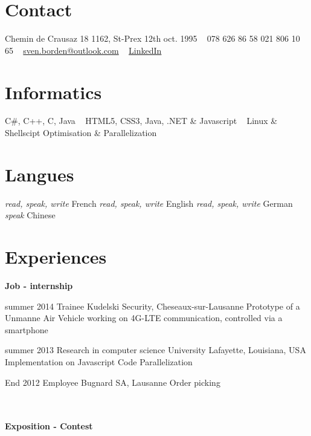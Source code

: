 \documentclass[]{friggeri-cv}
\begin{document}
	
	
	\begin{aside} %
		\section{Contact}
		{\color{light-gray}{\FA \faHome}} \small{Chemin de Crausaz 18
		1162, St-Prex}
		{\color{light-gray}{\FA \faBirthdayCake}} \small{12th oct. 1995}
		~
		{\color{light-gray}{\FA \faMobile}} \small{078 626 86 58}
		{\color{light-gray}{\FA \faPhone}} \small{021 806 10 65}
		~
		{\color{light-gray}{\FA \faEnvelope}}\href{mailto:sven.borden@outlook.com}{\small{sven.borden@outlook.com}}
		~
		{\color{linkedin}{\FA \faLinkedin}} \href{https://www.linkedin.com/in/sven-borden-bba744a0}{LinkedIn}	
		~
		\section{Informatics}
		\small{{\color{red} \FA \faHeart} C\#, C++, C, Java
			~
			{\color{html5}\FA {}} HTML5, CSS3,
			{\color{php}\FA \faCode} Java, .NET \& Javascript
			~
			{\color{gray}\FA \faLinux} Linux \& Shellscipt
			{\color{db}\FA \faTh} Optimisation \& Parallelization}
		~
		\section{Langues}
		\small{\emph{read, speak, write} French
		\emph{read, speak, write} English
		\emph{read, speak, write} German
		\emph{speak} Chinese}
	\end{aside}
	
	\section{Experiences}
	
	\textbf{Job - internship}%
	
	\begin{entrylist}
		
		\entry
		{summer 2014}
		{Trainee}
		{Kudelski Security, Cheseaux-sur-Lausanne}
		{Prototype of a Unmanne Air Vehicle working on 4G-LTE communication, controlled via a smartphone}
		
		\entry
		{summer 2013}
		{Research in computer science}
		{University Lafayette, Louisiana, USA}
		{Implementation on Javascript Code Parallelization}
		
		\entry
		{End 2012}
		{Employee}
		{Bugnard SA, Lausanne}
		{Order picking}
		
	\end{entrylist}
	\\ \\
	\textbf{Exposition - Contest} %
	
\end{document}
